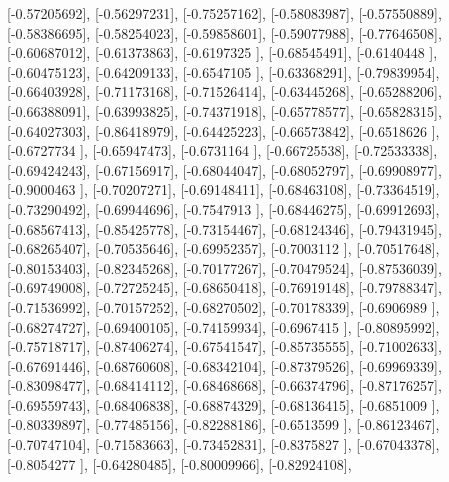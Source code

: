 \documentclass{article}
\begin{document}
       [-0.57205692],
       [-0.56297231],
       [-0.75257162],
       [-0.58083987],
       [-0.57550889],
       [-0.58386695],
       [-0.58254023],
       [-0.59858601],
       [-0.59077988],
       [-0.77646508],
       [-0.60687012],
       [-0.61373863],
       [-0.6197325 ],
       [-0.68545491],
       [-0.6140448 ],
       [-0.60475123],
       [-0.64209133],
       [-0.6547105 ],
       [-0.63368291],
       [-0.79839954],
       [-0.66403928],
       [-0.71173168],
       [-0.71526414],
       [-0.63445268],
       [-0.65288206],
       [-0.66388091],
       [-0.63993825],
       [-0.74371918],
       [-0.65778577],
       [-0.65828315],
       [-0.64027303],
       [-0.86418979],
       [-0.64425223],
       [-0.66573842],
       [-0.6518626 ],
       [-0.6727734 ],
       [-0.65947473],
       [-0.6731164 ],
       [-0.66725538],
       [-0.72533338],
       [-0.69424243],
       [-0.67156917],
       [-0.68044047],
       [-0.68052797],
       [-0.69908977],
       [-0.9000463 ],
       [-0.70207271],
       [-0.69148411],
       [-0.68463108],
       [-0.73364519],
       [-0.73290492],
       [-0.69944696],
       [-0.7547913 ],
       [-0.68446275],
       [-0.69912693],
       [-0.68567413],
       [-0.85425778],
       [-0.73154467],
       [-0.68124346],
       [-0.79431945],
       [-0.68265407],
       [-0.70535646],
       [-0.69952357],
       [-0.7003112 ],
       [-0.70517648],
       [-0.80153403],
       [-0.82345268],
       [-0.70177267],
       [-0.70479524],
       [-0.87536039],
       [-0.69749008],
       [-0.72725245],
       [-0.68650418],
       [-0.76919148],
       [-0.79788347],
       [-0.71536992],
       [-0.70157252],
       [-0.68270502],
       [-0.70178339],
       [-0.6906989 ],
       [-0.68274727],
       [-0.69400105],
       [-0.74159934],
       [-0.6967415 ],
       [-0.80895992],
       [-0.75718717],
       [-0.87406274],
       [-0.67541547],
       [-0.85735555],
       [-0.71002633],
       [-0.67691446],
       [-0.68760608],
       [-0.68342104],
       [-0.87379526],
       [-0.69969339],
       [-0.83098477],
       [-0.68414112],
       [-0.68468668],
       [-0.66374796],
       [-0.87176257],
       [-0.69559743],
       [-0.68406838],
       [-0.68874329],
       [-0.68136415],
       [-0.6851009 ],
       [-0.80339897],
       [-0.77485156],
       [-0.82288186],
       [-0.6513599 ],
       [-0.86123467],
       [-0.70747104],
       [-0.71583663],
       [-0.73452831],
       [-0.8375827 ],
       [-0.67043378],
       [-0.8054277 ],
       [-0.64280485],
       [-0.80009966],
       [-0.82924108],
\end{document}
